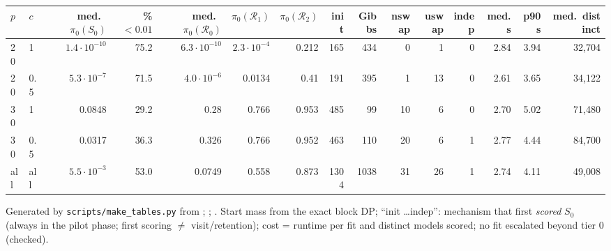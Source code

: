 \begin{center}
\scriptsize
\setlength{\tabcolsep}{2.6pt}
\begin{adjustbox}{max width=\linewidth}
\begin{tabular}{llrrrrrrrrrrrrr}
\toprule
$p$ & $c$ & med.\ $\pi_0(S_0)$ & \% $<0.01$ & med.\ $\pi_0(\mathcal R_0)$ & $\pi_0(\mathcal R_1)$ & $\pi_0(\mathcal R_2)$ & init & Gibbs & nswap & uswap & indep & med.\ s & p90 s & med.\ distinct \\
\midrule
20 & 1 & $1.4\cdot10^{-10}$ & 75.2 & $6.3\cdot10^{-10}$ & $2.3\cdot10^{-4}$ & 0.212 & 165 & 434 & 0 & 1 & 0 & 2.84 & 3.94 & 32{,}704 \\
20 & 0.5 & $5.3\cdot10^{-7}$ & 71.5 & $4.0\cdot10^{-6}$ & 0.0134 & 0.41 & 191 & 395 & 1 & 13 & 0 & 2.61 & 3.65 & 34{,}122 \\
30 & 1 & 0.0848 & 29.2 & 0.28 & 0.766 & 0.953 & 485 & 99 & 10 & 6 & 0 & 2.70 & 5.02 & 71{,}480 \\
30 & 0.5 & 0.0317 & 36.3 & 0.326 & 0.766 & 0.952 & 463 & 110 & 20 & 6 & 1 & 2.77 & 4.44 & 84{,}700 \\
all & all & $5.5\cdot10^{-3}$ & 53.0 & 0.0749 & 0.558 & 0.873 & 1304 & 1038 & 31 & 26 & 1 & 2.74 & 4.11 & 49{,}008 \\
\bottomrule
\end{tabular}
\end{adjustbox}
\end{center}
\par{\footnotesize Generated by \texttt{scripts/make\_tables.py} from ; ; . Start mass from the exact block DP; ``init \dots indep'': mechanism that first \emph{scored} $S_0$ (always in the pilot phase; first scoring $\neq$ visit/retention); cost = runtime per fit and distinct models scored; no fit escalated beyond tier 0 (checked).}\par
